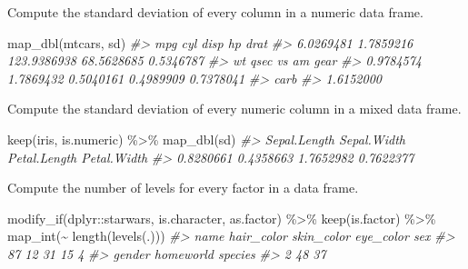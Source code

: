 \documentclass[
]{book}
\newenvironment{Shaded}{\begin{snugshade}}{\end{snugshade}}
\newcommand{\CommentTok}[1]{\textcolor[rgb]{0.56,0.35,0.01}{\textit{#1}}}
\newcommand{\FunctionTok}[1]{\textcolor[rgb]{0.00,0.00,0.00}{#1}}
\newcommand{\NormalTok}[1]{#1}
\newcommand{\SpecialCharTok}[1]{\textcolor[rgb]{0.00,0.00,0.00}{#1}}
\begin{document}
Compute the standard deviation of every column in a numeric data frame.

\begin{Shaded}
\begin{Highlighting}[]
\FunctionTok{map\_dbl}\NormalTok{(mtcars, sd)}
\CommentTok{\#\textgreater{}         mpg         cyl        disp          hp        drat }
\CommentTok{\#\textgreater{}   6.0269481   1.7859216 123.9386938  68.5628685   0.5346787 }
\CommentTok{\#\textgreater{}          wt        qsec          vs          am        gear }
\CommentTok{\#\textgreater{}   0.9784574   1.7869432   0.5040161   0.4989909   0.7378041 }
\CommentTok{\#\textgreater{}        carb }
\CommentTok{\#\textgreater{}   1.6152000}
\end{Highlighting}
\end{Shaded}

Compute the standard deviation of every numeric column in a mixed data frame.

\begin{Shaded}
\begin{Highlighting}[]
\FunctionTok{keep}\NormalTok{(iris, is.numeric) }\SpecialCharTok{\%\textgreater{}\%}
  \FunctionTok{map\_dbl}\NormalTok{(sd)}
\CommentTok{\#\textgreater{} Sepal.Length  Sepal.Width Petal.Length  Petal.Width }
\CommentTok{\#\textgreater{}    0.8280661    0.4358663    1.7652982    0.7622377}
\end{Highlighting}
\end{Shaded}

Compute the number of levels for every factor in a data frame.

\begin{Shaded}
\begin{Highlighting}[]
\FunctionTok{modify\_if}\NormalTok{(dplyr}\SpecialCharTok{::}\NormalTok{starwars, is.character, as.factor) }\SpecialCharTok{\%\textgreater{}\%}
  \FunctionTok{keep}\NormalTok{(is.factor) }\SpecialCharTok{\%\textgreater{}\%}
  \FunctionTok{map\_int}\NormalTok{(}\SpecialCharTok{\textasciitilde{}} \FunctionTok{length}\NormalTok{(}\FunctionTok{levels}\NormalTok{(.)))}
\CommentTok{\#\textgreater{}       name hair\_color skin\_color  eye\_color        sex }
\CommentTok{\#\textgreater{}         87         12         31         15          4 }
\CommentTok{\#\textgreater{}     gender  homeworld    species }
\CommentTok{\#\textgreater{}          2         48         37}
\end{Highlighting}
\end{Shaded}
\end{document}
